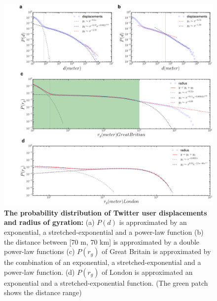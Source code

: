 \documentclass[]{tGIS2e}
\begin{document}
\begin{figure}[ht]
\includegraphics[width=1.0\linewidth]{./figure/S4_radius_displacement_3}
\caption{{\bf The probability distribution of Twitter user displacements and radius of gyration:} (a) $P(d)$ is approximated by an exponential, a stretched-exponential and a power-law function (b) the distance between [70 m, 70 km] is approximated by a double power-law functions (c) $P(r_g)$ of Great Britain is approximated by the combination of an exponential, a stretched-exponential and a power-law function. (d) $P(r_g)$ of London is approximated an exponential and a stretched-exponential function. (The green patch shows the distance range)}
\label{S4_Fig}
\end{figure}
\end{document}
